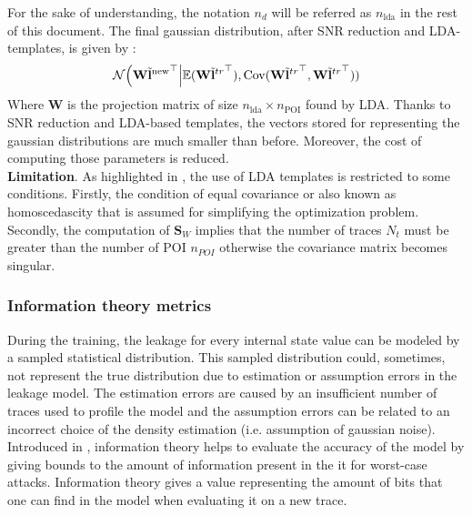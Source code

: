 For the sake of understanding, the notation $n_d$ will be referred as 
$n_{\text{lda}}$ in the rest of this document. The final gaussian 
distribution, after SNR reduction and LDA-templates, is given by :
\begin{equation*}
\mathcal{N}\Bigl({\mathbf{W}\tilde{\mathbf{l}}^\text{new}}^\top\Big|\mathbb{E}({\mathbf{W}\tilde{\mathbf{l}}^{tr}}^\top),\mathrm{Cov}({\mathbf{W}\tilde{\mathbf{l}}^{tr}}^\top,{\mathbf{W}\tilde{\mathbf{l}}^{tr}}^\top))
\end{equation*}Where $\mathbf{W}$ is the projection matrix of size 
$n_{\text{lda}} \times n_{\text{POI}}$ found by LDA. Thanks to SNR 
reduction and LDA-based templates, the vectors stored for representing the 
gaussian distributions are much smaller than before. Moreover, the cost of 
computing those parameters is reduced.\\

\textbf{Limitation}. As highlighted in 
\cite{efficient_template,lda_template}, the use of LDA templates is 
restricted to some conditions. Firstly, the condition of equal covariance 
or also known as homoscedascity that is assumed for simplifying the 
optimization problem. Secondly, the computation of $\mathbf{S}_W$ implies 
that the number of traces $N_t$ must be greater than the number of POI 
$n_{POI}$ otherwise the covariance matrix becomes singular.


\subsubsection{Information theory metrics}
During the training, the leakage for every internal state value can be 
modeled by a sampled statistical distribution. This sampled distribution 
could, sometimes, not represent the true distribution due to estimation or 
assumption errors in the leakage model. The estimation errors are caused 
by an insufficient number of traces used to profile the model and the 
assumption errors can be related to an incorrect choice of the density 
estimation (i.e. assumption of gaussian noise). Introduced in 
\cite{mutualInformationAnalysis,unifiedFramework}, information theory 
helps to evaluate the accuracy of the model by giving bounds to the amount 
of information present in the it for worst-case attacks. Information 
theory gives a value representing the amount of bits that one can find in 
the model when evaluating it on a new trace. 
